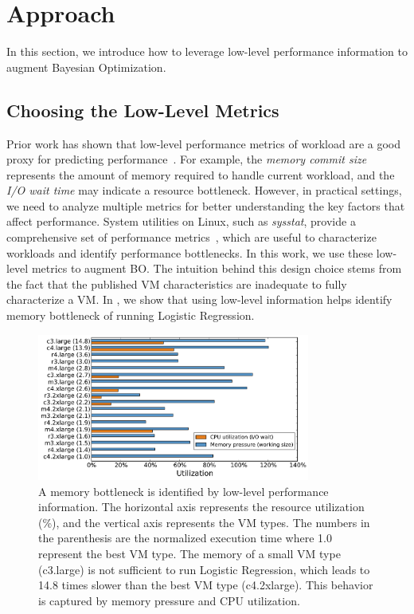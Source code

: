 \section{Approach}
\label{sec:approach}


In this section, we introduce how to leverage low-level performance information to augment Bayesian Optimization.


\subsection*{Choosing the Low-Level Metrics}

Prior work has shown that low-level performance metrics of workload are a good proxy for predicting performance~\cite{Novakovic2013, Hsu2016, Ousterhout2017, Yadwadkar2017}. For example, the \textit{memory commit size} represents the amount of memory required to handle current workload, and
the \textit{I/O wait time} may indicate a resource bottleneck.
However, in practical settings, we need to analyze multiple metrics for better understanding the key factors that affect performance.
System utilities on Linux, such as \emph{sysstat}, provide a comprehensive set of performance metrics~\cite{sysstat},
which are useful to characterize workloads and identify performance bottlenecks. In this work, we use these low-level metrics to augment BO.
The intuition behind this design choice stems from the fact that the published VM characteristics are inadequate to fully characterize a VM.
In \myfigure{\ref{fig:bottleneck}},
we show that using low-level information helps
identify memory bottleneck of running Logistic Regression.



\begin{figure}[!htbp]
    \centering
    \includegraphics[width=0.8\textwidth]{figures/bottleneck_spark.als.large.pdf}
    \caption{A memory bottleneck is identified by low-level performance information. The horizontal axis represents the resource utilization (\%), and the vertical axis represents the VM types. The numbers in the parenthesis are the normalized execution time where 1.0 represent the best VM type. The memory of a small VM type (c3.large) is not sufficient to run Logistic Regression, which leads to 14.8 times slower than the best VM type (c4.2xlarge). This behavior is captured by memory pressure and CPU utilization. 
}
    \label{fig:bottleneck}
\end{figure}

